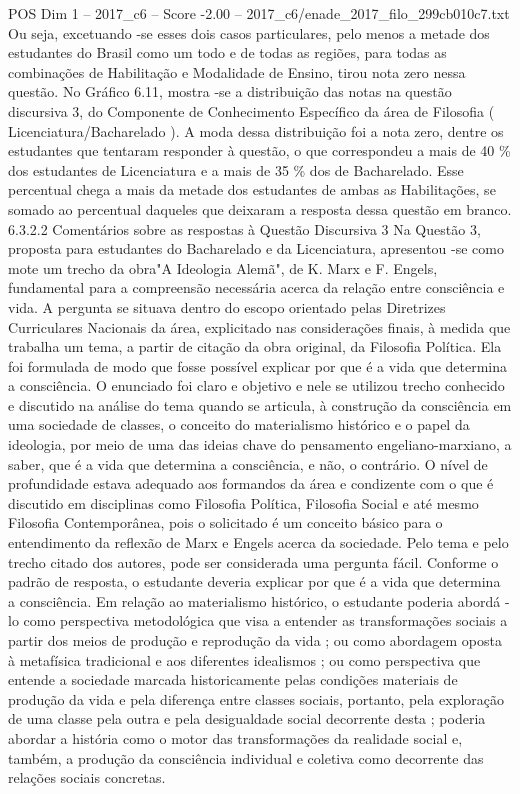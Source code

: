 \begin{textsample}{POS Dim 1 – 2017\_c6 – Score -2.00 – 2017\_c6/enade\_2017\_filo\_299cb010c7.txt}
Ou seja, excetuando -se esses dois casos particulares, pelo menos a metade dos estudantes do Brasil como um todo e de todas as regiões, para todas as combinações de Habilitação e Modalidade de Ensino, tirou nota zero nessa questão.
No Gráfico 6.11, mostra -se a distribuição das notas na questão discursiva 3, do Componente de Conhecimento Específico da área de Filosofia ( Licenciatura/Bacharelado ).
A moda dessa distribuição foi a nota zero, dentre os estudantes que tentaram responder à questão, o que correspondeu a mais de 40 \% dos estudantes de Licenciatura e a mais de 35 \% dos de Bacharelado.
Esse percentual chega a mais da metade dos estudantes de ambas as Habilitações, se somado ao percentual daqueles que deixaram a resposta dessa questão em branco. 6.3.2.2 Comentários sobre as respostas à Questão Discursiva 3 Na Questão 3, proposta para estudantes do Bacharelado e da Licenciatura, apresentou -se como mote um trecho da obra"A Ideologia Alemã", de K.
Marx e F.
Engels, fundamental para a compreensão necessária acerca da relação entre consciência e vida.
A pergunta se situava dentro do escopo orientado pelas Diretrizes Curriculares Nacionais da área, explicitado nas considerações finais, à medida que trabalha um tema, a partir de citação da obra original, da Filosofia Política.
Ela foi formulada de modo que fosse possível explicar por que é a vida que determina a consciência.
O enunciado foi claro e objetivo e nele se utilizou trecho conhecido e discutido na análise do tema quando se articula, à construção da consciência em uma sociedade de classes, o conceito do materialismo histórico e o papel da ideologia, por meio de uma das ideias chave do pensamento engeliano-marxiano, a saber, que é a vida que determina a consciência, e não, o contrário.
O nível de profundidade estava adequado aos formandos da área e condizente com o que é discutido em disciplinas como Filosofia Política, Filosofia Social e até mesmo Filosofia Contemporânea, pois o solicitado é um conceito básico para o entendimento da reflexão de Marx e Engels acerca da sociedade.
Pelo tema e pelo trecho citado dos autores, pode ser considerada uma pergunta fácil.
Conforme o padrão de resposta, o estudante deveria explicar por que é a vida que determina a consciência.
Em relação ao materialismo histórico, o estudante poderia abordá -lo como perspectiva metodológica que visa a entender as transformações sociais a partir dos meios de produção e reprodução da vida ; ou como abordagem oposta à metafísica tradicional e aos diferentes idealismos ; ou como perspectiva que entende a sociedade marcada historicamente pelas condições materiais de produção da vida e pela diferença entre classes sociais, portanto, pela exploração de uma classe pela outra e pela desigualdade social decorrente desta ; poderia abordar a história como o motor das transformações da realidade social e, também, a produção da consciência individual e coletiva como decorrente das relações sociais concretas.

\end{textsample}
